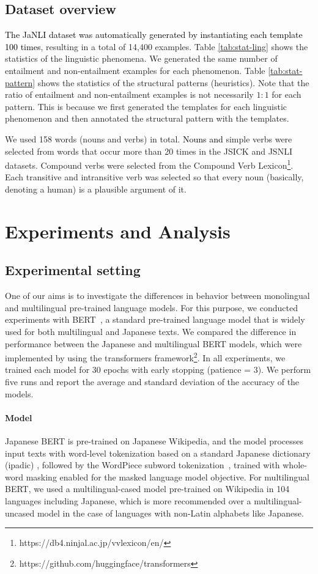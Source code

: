 \documentclass[11pt]{article}
\newcommand{\todo}[1]{\textcolor{black}{#1}}
\begin{document}
\subsection{Dataset overview}
\label{ssec:dataset}

\todo{The JaNLI dataset was automatically generated by instantiating each template 100 times},
resulting in a total of 14,400 examples.
Table \ref{tab:stat-ling} shows the statistics of the linguistic phenomena. We generated the same number of entailment and non-entailment examples for each phenomenon.
Table \ref{tab:stat-pattern} shows the statistics of the structural patterns (heuristics).
Note that the ratio of entailment and non-entailment examples is not necessarily $1:1$ for each pattern.
This is because we first generated the templates for each linguistic phenomenon and then
annotated the structural pattern with the templates.

We used 158 words (nouns and verbs) in total.
\todo{Nouns and} simple verbs were selected from words that occur more than 20 times
in the JSICK and JSNLI datasets.
Compound verbs were selected
from the Compound Verb Lexicon\footnote{https://db4.ninjal.ac.jp/vvlexicon/en/}.
Each transitive and intransitive verb was selected so that every noun (basically, denoting a human) is a plausible argument of it.

\section{Experiments and Analysis}
\label{sec:experiment}
\subsection{Experimental setting}
One of our aims is to investigate the differences in behavior between monolingual and multilingual pre-trained language models. 
For this purpose, we conducted experiments with BERT~\cite{devlin-etal-2019-bert}, a standard pre-trained language model that is widely used for both multilingual and Japanese texts.
We compared the difference in performance between the Japanese and multilingual BERT models, which were implemented by using the transformers framework\footnote{https://github.com/huggingface/transformers}.
In all experiments, we trained each model for 30
epochs with early stopping (patience = 3).
We perform five runs and report the
average and standard deviation of the accuracy of the models.

\paragraph{Model}
Japanese BERT is pre-trained on Japanese Wikipedia, and the model processes input texts with word-level tokenization based on a standard Japanese dictionary (ipadic) \cite{asahara03}, followed by the WordPiece subword tokenization~\cite{schuster2012japanese}, trained with whole-word masking enabled for the masked language model objective.
For multilingual BERT, we used a multilingual-cased model pre-trained on Wikipedia in 104 languages including Japanese, which is more recommended over a multilingual-uncased model in the case of languages with non-Latin alphabets like Japanese.
\end{document}
